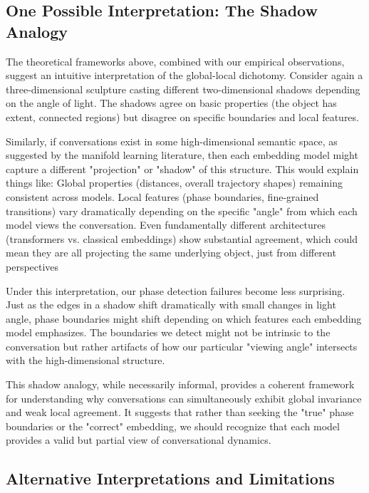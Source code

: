 \documentclass[11pt,letterpaper]{article}
\begin{document}
\subsection{One Possible Interpretation: The Shadow Analogy}

The theoretical frameworks above, combined with our empirical observations, suggest an intuitive interpretation of the global-local dichotomy. Consider again a three-dimensional sculpture casting different two-dimensional shadows depending on the angle of light. The shadows agree on basic properties (the object has extent, connected regions) but disagree on specific boundaries and local features.

Similarly, if conversations exist in some high-dimensional semantic space, as suggested by the manifold learning literature, then each embedding model might capture a different "projection" or "shadow" of this structure. This would explain things like: Global properties (distances, overall trajectory shapes) remaining consistent across models. Local features (phase boundaries, fine-grained transitions) vary dramatically depending on the specific "angle" from which each model views the conversation. Even fundamentally different architectures (transformers vs. classical embeddings) show substantial agreement, which could mean they are all projecting the same underlying object, just from different perspectives

Under this interpretation, our phase detection failures become less surprising. Just as the edges in a shadow shift dramatically with small changes in light angle, phase boundaries might shift depending on which features each embedding model emphasizes. The boundaries we detect might not be intrinsic to the conversation but rather artifacts of how our particular "viewing angle" intersects with the high-dimensional structure.

This shadow analogy, while necessarily informal, provides a coherent framework for understanding why conversations can simultaneously exhibit global invariance and weak local agreement. It suggests that rather than seeking the "true" phase boundaries or the "correct" embedding, we should recognize that each model provides a valid but partial view of conversational dynamics.

\subsection{Alternative Interpretations and Limitations}
\end{document}

